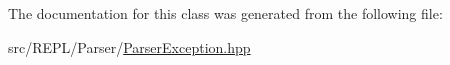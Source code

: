 The documentation for this class was generated from the following file\+:\begin{DoxyCompactItemize}
\item 
src/\+R\+E\+P\+L/\+Parser/\mbox{\hyperlink{_parser_exception_8hpp}{Parser\+Exception.\+hpp}}\end{DoxyCompactItemize}
